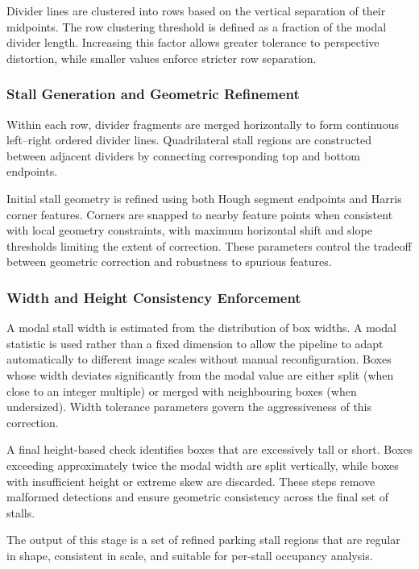 \documentclass[9pt,journal]{IEEEtran}
\begin{document}
	Divider lines are clustered into rows based on the vertical separation of their midpoints. The row clustering threshold is defined as a fraction of the modal divider length. Increasing this factor allows greater tolerance to perspective distortion, while smaller values enforce stricter row separation.
	
	\subsubsection{Stall Generation and Geometric Refinement}
	
	Within each row, divider fragments are merged horizontally to form continuous left–right ordered divider lines. Quadrilateral stall regions are constructed between adjacent dividers by connecting corresponding top and bottom endpoints.
	
	Initial stall geometry is refined using both Hough segment endpoints and Harris corner features. Corners are snapped to nearby feature points when consistent with local geometry constraints, with maximum horizontal shift and slope thresholds limiting the extent of correction. These parameters control the tradeoff between geometric correction and robustness to spurious features.
	
	\subsubsection{Width and Height Consistency Enforcement}
	
	A modal stall width is estimated from the distribution of box widths. A modal statistic is used rather than a fixed dimension to allow the pipeline to adapt automatically to different image scales without manual reconfiguration. Boxes whose width deviates significantly from the modal value are either split (when close to an integer multiple) or merged with neighbouring boxes (when undersized). Width tolerance parameters govern the aggressiveness of this correction.
	
	A final height-based check identifies boxes that are excessively tall or short. Boxes exceeding approximately twice the modal width are split vertically, while boxes with insufficient height or extreme skew are discarded. These steps remove malformed detections and ensure geometric consistency across the final set of stalls.
	
	The output of this stage is a set of refined parking stall regions that are regular in shape, consistent in scale, and suitable for per-stall occupancy analysis.
\end{document}
